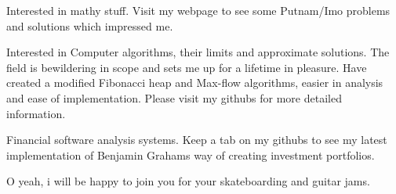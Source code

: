 

\begin{cventries}

  \cventryOnlyDescription
    {
      \begin{cvitems} %
        \item {Interested in mathy stuff. Visit my webpage to see some Putnam/Imo problems and solutions which impressed me.}
        \item {Interested in Computer algorithms, their limits and approximate solutions. The field is bewildering in scope and sets me up for a lifetime in pleasure. Have created a modified Fibonacci heap and Max-flow algorithms, easier in analysis and ease of implementation. Please visit my githubs for more detailed information.}
        \item {Financial software analysis systems. Keep a tab on my githubs to see my latest implementation of Benjamin  Grahams way of creating investment portfolios.}
	\item {O yeah, i will be happy to join you for your skateboarding and guitar jams.}
      \end{cvitems}
    }

\end{cventries}
